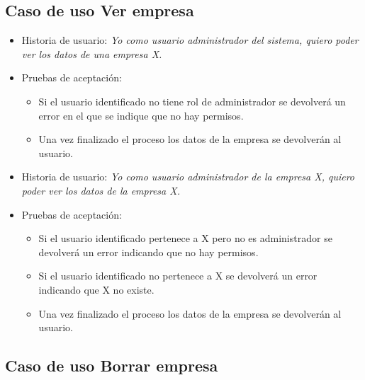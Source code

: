 \documentclass[12pt,a4paperpaper,]{report}
\providecommand{\tightlist}{%
  \setlength{\itemsep}{0pt}\setlength{\parskip}{0pt}}
\begin{document}
\subsection{Caso de uso Ver empresa}\label{caso-de-uso-ver-empresa}

\begin{itemize}
\tightlist
\item
  Historia de usuario: \emph{Yo como usuario administrador del sistema,
  quiero poder ver los datos de una empresa X.}
\item
  Pruebas de aceptación:

  \begin{itemize}
  \tightlist
  \item
    Si el usuario identificado no tiene rol de administrador se
    devolverá un error en el que se indique que no hay permisos.
  \item
    Una vez finalizado el proceso los datos de la empresa se devolverán
    al usuario.
  \end{itemize}
\item
  Historia de usuario: \emph{Yo como usuario administrador de la empresa
  X, quiero poder ver los datos de la empresa X.}
\item
  Pruebas de aceptación:

  \begin{itemize}
  \tightlist
  \item
    Si el usuario identificado pertenece a X pero no es administrador se
    devolverá un error indicando que no hay permisos.
  \item
    Si el usuario identificado no pertenece a X se devolverá un error
    indicando que X no existe.
  \item
    Una vez finalizado el proceso los datos de la empresa se devolverán
    al usuario.
  \end{itemize}
\end{itemize}

\subsection{Caso de uso Borrar
empresa}\label{caso-de-uso-borrar-empresa}
\end{document}
